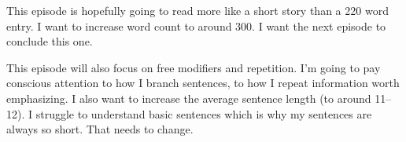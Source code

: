 This episode is hopefully going to read more like a short story than a 220 word entry. I want to increase word count to around 300. I want the next episode to conclude this one.

This episode will also focus on free modifiers and repetition. I'm going to pay conscious attention to how I branch sentences, to how I repeat information worth emphasizing. I also want to increase the average sentence length (to around 11--12). I struggle to understand basic sentences which is why my sentences are always so short. That needs to change.
